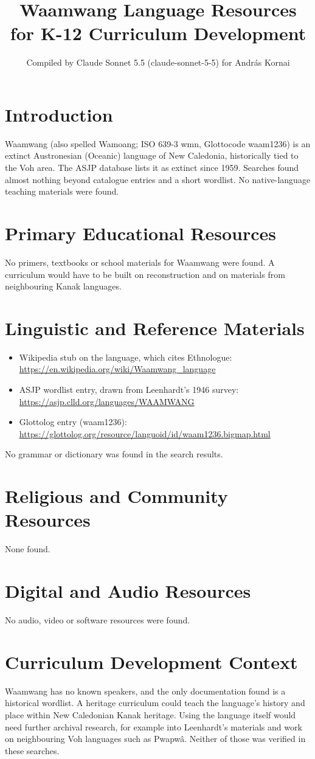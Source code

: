 \documentclass[12pt]{article}
\title{Waamwang Language Resources for K-12 Curriculum Development}
\author{Compiled by Claude Sonnet 5.5 (claude-sonnet-5-5) for Andr\'as Kornai}
\date{}
\begin{document}
\maketitle

\section{Introduction}
Waamwang (also spelled Wamoang; ISO 639-3 wmn, Glottocode waam1236) is an extinct Austronesian (Oceanic) language of New Caledonia, historically tied to the Voh area. The ASJP database lists it as extinct since 1959. Searches found almost nothing beyond catalogue entries and a short wordlist. No native-language teaching materials were found.

\section{Primary Educational Resources}
No primers, textbooks or school materials for Waamwang were found. A curriculum would have to be built on reconstruction and on materials from neighbouring Kanak languages.

\section{Linguistic and Reference Materials}
\begin{itemize}
\item Wikipedia stub on the language, which cites Ethnologue: \url{https://en.wikipedia.org/wiki/Waamwang_language}
\item ASJP wordlist entry, drawn from Leenhardt's 1946 survey: \url{https://asjp.clld.org/languages/WAAMWANG}
\item Glottolog entry (waam1236): \url{https://glottolog.org/resource/languoid/id/waam1236.bigmap.html}
\end{itemize}
No grammar or dictionary was found in the search results.

\section{Religious and Community Resources}
None found.

\section{Digital and Audio Resources}
No audio, video or software resources were found.

\section{Curriculum Development Context}
Waamwang has no known speakers, and the only documentation found is a historical wordlist. A heritage curriculum could teach the language's history and place within New Caledonian Kanak heritage. Using the language itself would need further archival research, for example into Leenhardt's materials and work on neighbouring Voh languages such as Pwapw\^a. Neither of those was verified in these searches.
\end{document}
